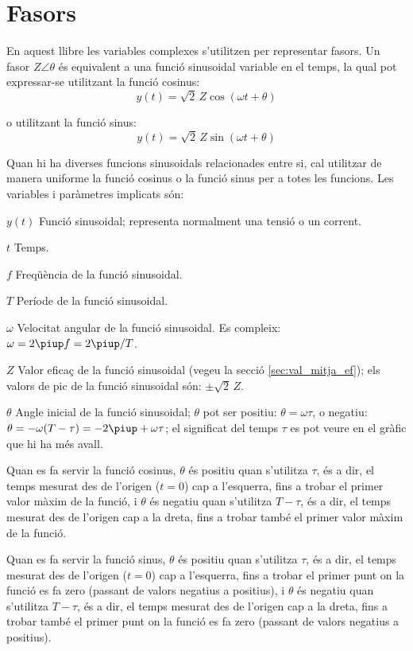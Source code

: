 \section*{Fasors}  \label{sec:fasors}

En aquest llibre les variables complexes s'utilitzen per representar fasors. Un fasor $Z\angle\theta$ és equivalent a una funció sinusoidal variable en el temps, la qual pot expressar-se utilitzant la funció cosinus:
\[y(t)=\sqrt{2}\, Z \cos(\omega t + \theta)\]

o utilitzant la funció sinus:
\[y(t)=\sqrt{2}\, Z \sin(\omega t + \theta)\]

Quan hi ha diverses funcions sinusoidals relacionades entre si, cal utilitzar de manera uniforme la funció cosinus o la funció sinus per a totes les funcions. Les variables i paràmetres implicats són:
\begin{list}{}
{\setlength{\labelwidth}{15mm} \setlength{\leftmargin}{20mm}
\setlength{\labelsep}{5mm}}
    \item[$y(t)$] Funció sinusoidal; representa normalment una tensió o un corrent.
    \item[$t$] Temps.
    \item[$f$] Freqüència de la funció sinusoidal.
    \item[$T$] Període de la funció sinusoidal.
    \item[$\omega$] Velocitat angular de la funció sinusoidal. Es compleix: $\omega = 2 \piup f = 2 \piup/T$.
    \item[$Z$] Valor eficaç de la funció sinusoidal (vegeu la secció \vref{sec:val_mitja_ef}); els valors de pic de la funció sinusoidal  són:  $\pm\sqrt{2}\, Z$.
    \item[$\theta$] Angle inicial de la funció sinusoidal;  $\theta$ pot ser positiu: $\theta=\omega \tau$, o negatiu: $\theta = -\omega (T-\tau) = -2\piup + \omega \tau$; el significat del temps $\tau$  es pot veure en el gràfic que hi ha més avall.

    Quan es fa servir la funció cosinus, $\theta$ és positiu quan s'utilitza $\tau$, és a dir, el temps mesurat  des de l'origen ($t=0$) cap a l'esquerra, fins a trobar el primer valor màxim de la funció, i $\theta$ és negatiu quan s'utilitza $T-\tau$, és a dir, el temps mesurat des de l'origen cap a la dreta, fins a trobar també el primer valor màxim de la funció.

    Quan es fa servir la funció sinus, $\theta$ és positiu quan s'utilitza $\tau$, és a dir, el temps mesurat des de l'origen ($t=0$) cap a l'esquerra, fins a trobar el primer punt on la funció es fa zero (passant de valors negatius a positius), i $\theta$ és negatiu quan s'utilitza $T-\tau$, és a dir, el temps mesurat des de l'origen cap a la dreta, fins a trobar també el primer punt on la funció es fa zero (passant de valors negatius a positius).
    \item[] 
\end{list}

